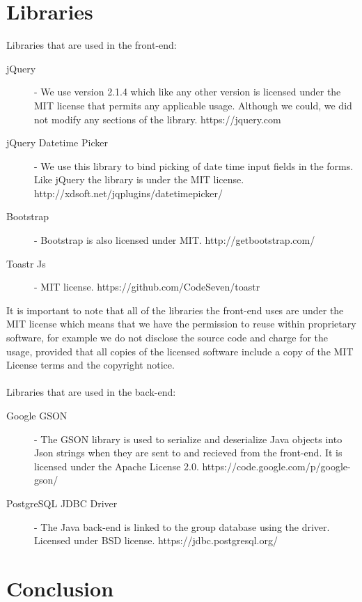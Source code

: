 \documentclass[10pt,a4paper]{article}
\begin{document}
\section{Libraries}
Libraries that are used in the front-end:
\begin{description}
\item[jQuery] - We use version 2.1.4 which like any other version is licensed under the MIT license that permits any applicable usage. Although we could, we did not modify any sections of the library. https://jquery.com
\item[jQuery Datetime Picker] - We use this library to bind picking of date time input fields in the forms. Like jQuery the library is under the MIT license. http://xdsoft.net/jqplugins/datetimepicker/
\item[Bootstrap] - Bootstrap is also licensed under MIT. http://getbootstrap.com/
\item[Toastr Js] - MIT license. https://github.com/CodeSeven/toastr
\end{description}
It is important to note that all of the libraries the front-end uses are under the MIT license which means that we have the permission to reuse within proprietary software, for example we do not disclose the source code and charge for the usage, provided that all copies of the licensed software include a copy of the MIT License terms and the copyright notice. \\ \\
Libraries that are used in the back-end:
\begin{description}
\item[Google GSON] - The GSON library is used to serialize and deserialize Java objects into Json strings when they are sent to and recieved from the front-end. It is licensed under the Apache License 2.0. https://code.google.com/p/google-gson/
\item[PostgreSQL JDBC Driver] - The Java back-end is linked to the group database using the driver. Licensed under BSD license. https://jdbc.postgresql.org/
\end{description}

\section{Conclusion}
\end{document}
